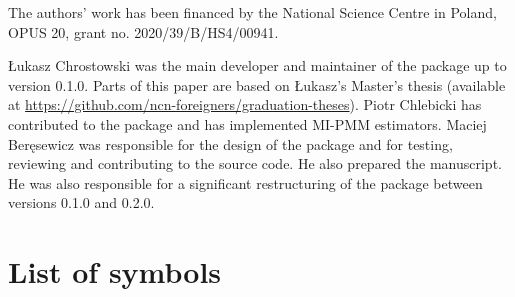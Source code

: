 \documentclass[
]{jss}
\begin{document}
The authors' work has been financed by the National Science Centre in
Poland, OPUS 20, grant no. 2020/39/B/HS4/00941.

Łukasz Chrostowski was the main developer and maintainer of the package
up to version 0.1.0. Parts of this paper are based on Łukasz's Master's
thesis (available at
\url{https://github.com/ncn-foreigners/graduation-theses}). Piotr
Chlebicki has contributed to the package and has implemented MI-PMM
estimators. Maciej Beręsewicz was responsible for the design of the
package and for testing, reviewing and contributing to the source code.
He also prepared the manuscript. He was also responsible for a
significant restructuring of the package between versions 0.1.0 and
0.2.0.

\clearpage

\appendix

\section{List of symbols}\label{list-of-symbols}
\end{document}
